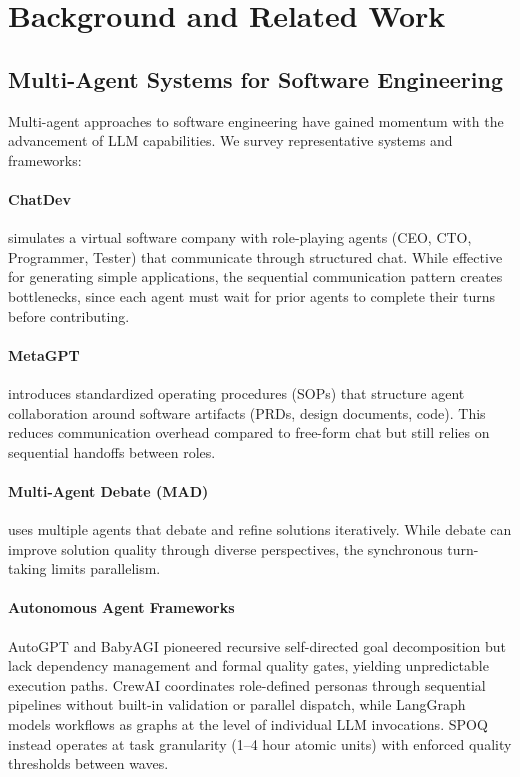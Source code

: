 \section{Background and Related Work}
\label{sec:related_work}

\subsection{Multi-Agent Systems for Software Engineering}

Multi-agent approaches to software engineering have gained momentum with the
advancement of LLM capabilities. We survey representative systems and frameworks:

\paragraph{ChatDev} \citep{qian2023chatdev} simulates a virtual software company
with role-playing agents (CEO, CTO, Programmer, Tester) that communicate through
structured chat. While effective for generating simple applications, the sequential
communication pattern creates bottlenecks, since each agent must wait for prior agents
to complete their turns before contributing.

\paragraph{MetaGPT} \citep{hong2023metagpt} introduces standardized operating
procedures (SOPs) that structure agent collaboration around software artifacts
(PRDs, design documents, code). This reduces communication overhead compared to
free-form chat but still relies on sequential handoffs between roles.

\paragraph{Multi-Agent Debate (MAD)} \citep{liang2023encouraging} uses multiple
agents that debate and refine solutions iteratively. While debate can improve
solution quality through diverse perspectives, the synchronous turn-taking
limits parallelism.

\paragraph{Autonomous Agent Frameworks} AutoGPT \citep{autogpt2023} and
BabyAGI \citep{babyagi2023} pioneered recursive self-directed goal decomposition
but lack dependency management and formal quality gates, yielding unpredictable
execution paths. CrewAI \citep{crewai2024} coordinates role-defined personas
through sequential pipelines without built-in validation or parallel dispatch,
while LangGraph \citep{langgraph2024} models workflows as graphs at the level of
individual LLM invocations. SPOQ instead operates at task granularity (1--4 hour
atomic units) with enforced quality thresholds between waves.

